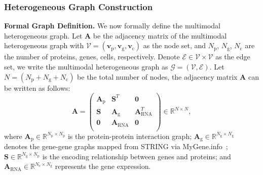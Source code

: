\subsubsection{Heterogeneous Graph Construction} %

\noindent\textbf{Formal Graph Definition.} We now formally define the multimodal heterogeneous graph. Let $\mathbf{A}$ be the adjacency matrix of the multimodal heterogeneous graph with $\mathcal{V} = \left(\mathbf{v}_{\text{p}}, \mathbf{v}_{\text{g}}, \mathbf{v}_{\text{c}} \right)$ as the node set, %
and $N_{\text{p}}$, $N_{\text{g}}$, $N_{\text{c}}$ are the number of proteins, genes, cells, respectively. Denote $\mathcal{E}\in \mathcal{V} \times \mathcal{V}$ as the edge set, we write the multimodal heterogeneous graph as $\mathcal{G} = \left(\mathcal{V}, \mathcal{E} \right)$. Let $N =(N_{\text{p}}+N_{\text{g}}+N_{\text{c}})$ be the total number of nodes, the adjacency matrix $\mathbf{A}$ can be written as follows:
\begin{equation}
    \mathbf{A}=\left(\begin{array}{ccc}
        \mathbf{A}_{\text{p}} & \mathbf{S}^T & \mathbf{0} \\
        \mathbf{S} & \mathbf{A}_{\text{g}} & \mathbf{A}_\text{RNA}^T \\
        \mathbf{0} & \mathbf{A}_\text{RNA} & \mathbf{0} \\
    \end{array}\right) \in \mathbb{R}^{N\times N},
\end{equation}
where $\mathbf{A}_{\text{p}} \in \mathbb{R}^{N_{\text{p}}\times N_{\text{p}}}$ is the protein-protein interaction graph; $\mathbf{A}_{\text{g}} \in \mathbb{R}^{N_{\text{g}}\times N_{\text{g}}}$ denotes the gene-gene graphs mapped from STRING via MyGene.info~\cite{lelong2022biothings}; $\mathbf{S} \in \mathbb{R}^{N_{\text{g}}\times N_{\text{p}}}$ is the encoding relationship between genes and proteins; and $\mathbf{A}_\text{RNA} \in \mathbb{R}^{N_{\text{c}}\times N_{\text{g}}}$ represents the gene expression. 

